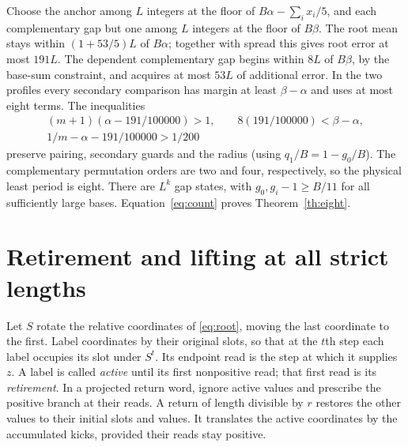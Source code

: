 \documentclass[11pt,reqno]{amsart}
\theoremstyle{remark}
\begin{document}
Choose the anchor among \(L\) integers at the floor of
\(B\alpha-\sum_i x_i/5\), and each complementary gap but one
among \(L\) integers at the floor of \(B\beta\).
The root mean stays within \((1+53/5)L\) of \(B\alpha\);
together with spread this gives root error at most \(191L\).
The dependent complementary gap begins within \(8L\)
of \(B\beta\), by the base-sum constraint, and acquires at most
\(53L\) of additional error. In the
two profiles every secondary comparison has margin
at least \(\beta-\alpha\) and uses at most eight terms.
The inequalities
\[
\begin{gathered}
(m+1)(\alpha-191/100000)>1,\qquad
8(191/100000)<\beta-\alpha,\\
1/m-\alpha-191/100000>1/200
\end{gathered}
\]
preserve pairing, secondary guards and the radius (using \(q_1/B=1-g_0/B\)).
The complementary permutation orders are two and four,
respectively, so the physical least period is eight.
There are \(L^k\) gap states, with \(g_0,g_i-1\ge B/11\)
for all sufficiently large bases. Equation~\eqref{eq:count}
proves Theorem~\ref{th:eight}.

\section{Retirement and lifting at all strict lengths}\label{sec:lift}

Let \(S\) rotate the relative coordinates of \eqref{eq:root}, moving
the last coordinate to the first. Label coordinates by their original
slots, so that at the \(t\)th step each label occupies its slot under
\(S^t\). Its endpoint read is the step at which it supplies \(z\).
A label is called \emph{active} until its first nonpositive read;
that first read is its \emph{retirement}. In a projected return word,
ignore active values and prescribe the positive branch at their reads.
A return of length divisible by \(r\) restores the other values to
their initial slots and values. It translates the active coordinates
by the accumulated kicks, provided their reads stay positive.
\end{document}
